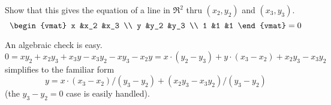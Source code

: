 

\begin{Exercise}[
name={},
title={}, 
difficulty=0,
origin={\cite{JH}}]
Show that this gives the equation of a line in \( \Re^2 \) thru
        \( (x_2,y_2) \) and \( (x_3,y_3) \).
        \begin{equation*}
          \begin{vmat}
            x    &x_2 &x_3  \\
            y    &y_2 &y_3  \\
            1    &1   &1
          \end{vmat}=0
        \end{equation*}

\end{Exercise}

\begin{Answer}
An algebraic check is easy.
        \begin{equation*}
          0
          =xy_2+x_2y_3+x_3y-x_3y_2-xy_3-x_2y 
          =x\cdot (y_2-y_3)+y\cdot (x_3-x_2)+x_2y_3-x_3y_2 
        \end{equation*}
        simplifies to the familiar form
        \begin{equation*}
          y=x\cdot (x_3-x_2)/(y_3-y_2)+(x_2y_3-x_3y_2)/(y_3-y_2)
        \end{equation*}
        (the $y_3-y_2=0$ case is easily handled).

\end{Answer}
